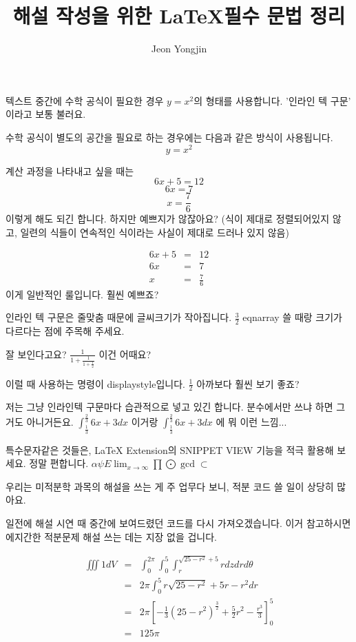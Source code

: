 \documentclass{article}
\author{Jeon Yongjin}
\title{해설 작성을 위한 \LaTeX 필수 문법 정리}
\date{}
\begin{document}
\maketitle

텍스트 중간에 수학 공식이 필요한 경우 \( y=x^2 \)의 형태를 사용합니다. '인라인 텍 구문' 이라고 보통 불러요.

수학 공식이 별도의 공간을 필요로 하는 경우에는 다음과 같은 방식이 사용됩니다. \[ y=x^2 \]

계산 과정을 나타내고 싶을 때는
\[6x + 5 = 12\]
\[6x = 7\]
\[x = \frac{7}{6}\]
이렇게 해도 되긴 합니다. 하지만 예쁘지가 않잖아요? (식이 제대로 정렬되어있지 않고, 일련의 식들이 연속적인 식이라는 사실이 제대로 드러나 있지 않음)

\begin{eqnarray*}
    6x + 5 &=& 12 \\
    6x &=& 7 \\
    x &=& \frac{7}{6}
\end{eqnarray*}
이게 일반적인 룰입니다. 훨씬 예쁘죠?

인라인 텍 구문은 줄맞춤 때문에 글씨크기가 작아집니다. \( \frac{3}{2} \) eqnarray 쓸 때랑 크기가 다르다는 점에 주목해 주세요.

잘 보인다고요? \(\frac{1}{1+\frac{1}{1+\frac{1}{2}}}\) 이건 어때요?

이럴 때 사용하는 명령이 displaystyle입니다. \( \displaystyle \frac{1}{2} \) 아까보다 훨씬 보기 좋죠?

저는 그냥 인라인텍 구문마다 습관적으로 넣고 있긴 합니다. 분수에서만 쓰냐 하면 그거도 아니거든요. \(\displaystyle \int_{\frac{1}{3}}^{\frac{2}{3}} 6x+3 dx\) 이거랑 \(\int_{\frac{1}{3}}^{\frac{2}{3}} 6x + 3 dx\) 에 뭐 이런 느낌...

특수문자같은 것들은, LaTeX Extension의 SNIPPET VIEW 기능을 적극 활용해 보세요. 정말 편합니다.
\(\alpha \psi E \lim_{x \to \infty} \prod \bigodot \gcd \subset \)

우리는 미적분학 과목의 해설을 쓰는 게 주 업무다 보니, 적분 코드 쓸 일이 상당히 많아요.

일전에 해설 시연 때 중간에 보여드렸던 코드를 다시 가져오겠습니다. 이거 참고하시면 에지간한 적분문제 해설 쓰는 데는 지장 없을 겁니다.

\begin{eqnarray*}
    \iiint 1 dV &=& \int_{0}^{2\pi} \int_{0}^{5} \int_{r}^{\sqrt{25-r^2}+5} r dz dr d\theta \\
    &=& 2\pi \int_{0}^{5} r\sqrt{25-r^2} + 5r -r^2 dr \\
    &=& 2\pi \left[ -\frac{1}{3}(25-r^2)^{\frac{3}{2}} + \frac{5}{2}r^2 - \frac{r^3}{3} \right]_{0}^{5} \\
    &=& 125\pi
\end{eqnarray*}
\end{document}
